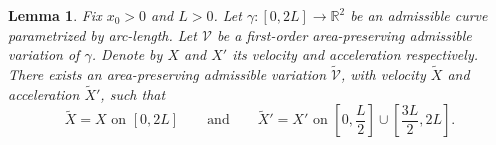 \documentclass[11pt]{amsart}
\newcommand{\rr}{{\mathbb{R}}}
\newcommand{\Om}{\Omega}
\newtheorem{lemma}[theorem]{Lemma}
\theoremstyle{definition}
\theoremstyle{remark}
\numberwithin{equation}{section}
\begin{document}
	\begin{lemma}\label{docarmo}
		Fix $x_0>0$ and $L>0$. Let $\gamma:[0,2L]\to\rr^2$ be an admissible curve parametrized by arc-length. Let $\mathcal V$ be a first-order area-preserving admissible variation of $\gamma$. Denote by $X$ and $X'$ its velocity and acceleration respectively.  There exists an area-preserving admissible variation $ \mathcal {\tilde V}$, with velocity $\tilde X$ and acceleration $\tilde X'$, such that 
		\begin{equation}\label{docarmopropultimateequation}
			\tilde X=X\text{ on $[0,2L]$}\qquad\text{and}\qquad\tilde X'=X'\text{ on }\left[0,\frac{L}{2}\right]\cup\left[\frac{3L}{2},2L\right].
		\end{equation}
	\end{lemma}
\end{document}

